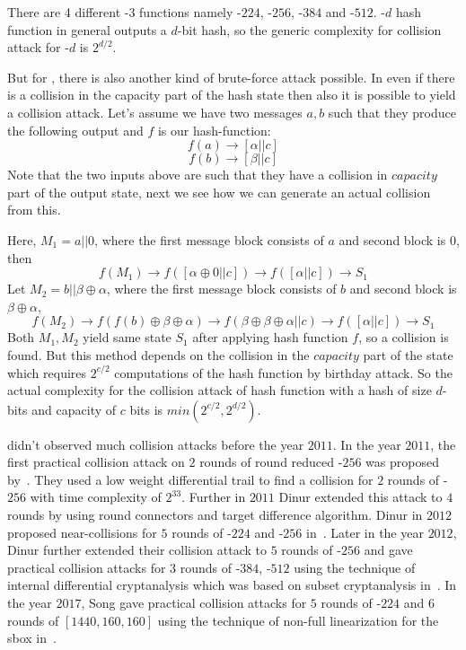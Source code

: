 There are 4 different \SHA-$3$ functions namely -$224$, -$256$, -$384$ and -$512$. -$d$ hash function in general outputs a $d$-bit hash, so the generic complexity for collision attack for -$d$ is $2^{d/2}$.

But for \KECCAK{}, there is also another kind of brute-force attack possible. In \KECCAK{} even if there is a collision in the capacity part of the hash state then also it is possible to yield a collision attack. Let's assume we have two messages $a, b$ such that they produce the following output and $f$ is our hash-function:
\[
    f(a) \rightarrow \left[ \alpha || c \right]
\]
\[
    f(b) \rightarrow \left[ \beta || c \right]
\]
Note that the two inputs above are such that they have a collision in $capacity$ part of the output state, next we see how we can generate an actual collision from this.

Here, $M_1 = a || 0$, where the first message block consists of $a$ and second block is $0$, then
\[
    f(M_1) \rightarrow f\left( \left[ \alpha \oplus 0 || c \right] \right) \rightarrow f\left( \left[ \alpha || c \right] \right) \rightarrow S_1
\]
Let $M_2 = b || \beta \oplus \alpha$, where the first message block consists of $b$ and second block is $\beta \oplus \alpha$, 
\[
    f(M_2) \rightarrow f\left( f(b) \oplus \beta \oplus \alpha \right) \rightarrow f\left( \beta \oplus \beta \oplus \alpha || c \right) \rightarrow f\left( \left[\alpha || c\right] \right) \rightarrow S_1
\]
Both $M_1, M_2$ yield same state $S_1$ after applying hash function $f$, so a collision is found. But this method depends on the collision in the $capacity$ part of the state which requires $2^{c/2}$ computations of the hash function by birthday attack. So the actual complexity for the collision attack of \KECCAK{} hash function with a hash of size $d$-bits and capacity of $c$ bits is $min\left( 2^{c/2}, 2^{d/2}\right)$.

\KECCAK{} didn't observed much collision attacks before the year $2011$. In the year $2011$, the first practical collision attack on $2$ rounds of round reduced \KECCAK-$256$ was proposed by~\cite{naya2011practical}. They used a low weight differential trail to find a collision for $2$ rounds of \KECCAK-$256$ with time complexity of $2^{33}$. Further in $2011$ Dinur \etal extended this attack to $4$ rounds by using round connectors and target difference algorithm. Dinur \etal in $2012$ proposed near-collisions for $5$ rounds of \KECCAK-$224$ and \KECCAK-$256$ in~\cite{dinur2012new}. Later in the year $2012$, Dinur \etal further extended their collision attack to $5$ rounds of \KECCAK-$256$ and gave practical collision attacks for $3$ rounds of \KECCAK-$384$, \KECCAK-$512$ using the technique of internal differential cryptanalysis which was based on subset cryptanalysis in~\cite{dinur2013collision}. In the year $2017$, Song \etal gave practical collision attacks for $5$ rounds of \KECCAK-$224$ and $6$ rounds of \KECCAK$[1440, 160, 160]$ using the technique of non-full linearization for the \KECCAK{} sbox in~\cite{song2017non}.

